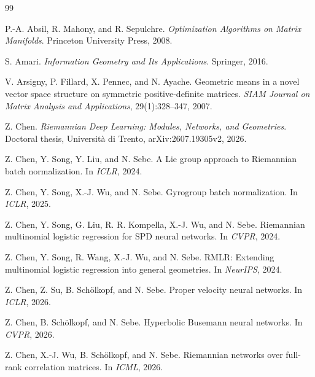 \begin{thebibliography}{99}

P.-A. Absil, R. Mahony, and R. Sepulchre.
\newblock \emph{Optimization Algorithms on Matrix Manifolds}.
\newblock Princeton University Press, 2008.

S. Amari.
\newblock \emph{Information Geometry and Its Applications}.
\newblock Springer, 2016.

V. Arsigny, P. Fillard, X. Pennec, and N. Ayache.
\newblock Geometric means in a novel vector space structure on symmetric positive-definite matrices.
\newblock \emph{SIAM Journal on Matrix Analysis and Applications}, 29(1):328--347, 2007.

Z. Chen.
\newblock \emph{Riemannian Deep Learning: Modules, Networks, and Geometries}.
\newblock Doctoral thesis, Universit\`a di Trento, arXiv:2607.19305v2, 2026.

Z. Chen, Y. Song, Y. Liu, and N. Sebe.
\newblock A Lie group approach to Riemannian batch normalization.
\newblock In \emph{ICLR}, 2024.

Z. Chen, Y. Song, X.-J. Wu, and N. Sebe.
\newblock Gyrogroup batch normalization.
\newblock In \emph{ICLR}, 2025.

Z. Chen, Y. Song, G. Liu, R. R. Kompella, X.-J. Wu, and N. Sebe.
\newblock Riemannian multinomial logistic regression for SPD neural networks.
\newblock In \emph{CVPR}, 2024.

Z. Chen, Y. Song, R. Wang, X.-J. Wu, and N. Sebe.
\newblock RMLR: Extending multinomial logistic regression into general geometries.
\newblock In \emph{NeurIPS}, 2024.

Z. Chen, Z. Su, B. Sch\"olkopf, and N. Sebe.
\newblock Proper velocity neural networks.
\newblock In \emph{ICLR}, 2026.

Z. Chen, B. Sch\"olkopf, and N. Sebe.
\newblock Hyperbolic Busemann neural networks.
\newblock In \emph{CVPR}, 2026.

Z. Chen, X.-J. Wu, B. Sch\"olkopf, and N. Sebe.
\newblock Riemannian networks over full-rank correlation matrices.
\newblock In \emph{ICML}, 2026.


\end{thebibliography}
